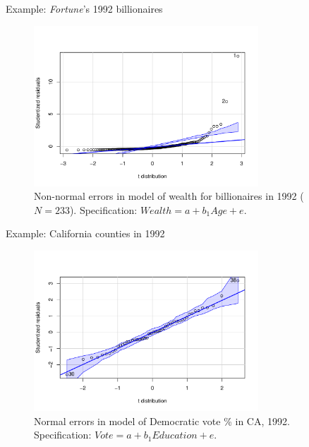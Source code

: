 \documentclass[12pt,english,pdf,xcolor=dvipsnames,aspectratio=169,handout]{beamer}\usepackage[]{graphicx}\usepackage[]{xcolor}
\begin{document}
\begin{frame}{Example: \textit{Fortune}'s 1992 billionaires}



\begin{figure}
\includegraphics[width=0.75\textwidth]{../04-graphs/01-08.pdf}
\caption{\label{fig:fig-9} Non-normal errors in model of wealth for billionaires in 1992 ($N=233$). Specification: $Wealth = a + b_1Age + e$.}
\end{figure}

\end{frame}



\begin{frame}{Example: California counties in 1992}

\begin{figure}
\includegraphics[width=0.75\textwidth]{../04-graphs/01-09.pdf}
\caption{\label{fig:fig-12} Normal errors in model of Democratic vote \% in CA, 1992. Specification: $Vote = a + b_1Education + e$.}
\end{figure}

\end{frame}
\end{document}
